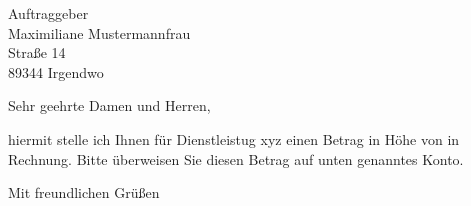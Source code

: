 \documentclass[DIN,visualize,fromalign=right,firstfoot=true,fromfax=false,fromphone=false]{scrlttr2}
\begin{document}
\begin{letter}{Auftraggeber\\Maximiliane Mustermannfrau\\Straße 14\\89344 Irgendwo}
\opening{Sehr geehrte Damen und Herren,}

hiermit stelle ich Ihnen für Dienstleistug xyz einen Betrag in Höhe von  in Rechnung. Bitte überweisen Sie diesen Betrag auf unten genanntes Konto. 


\closing{Mit freundlichen Grüßen}
\end{letter}
\end{document}
